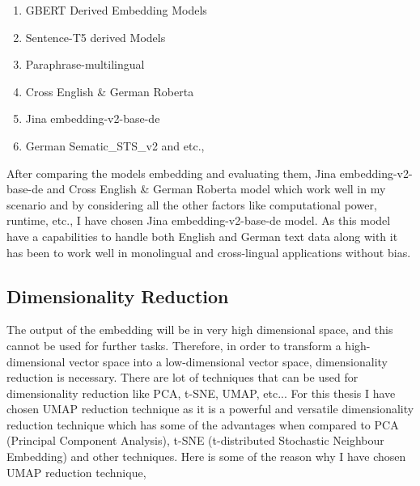  \begin{enumerate}
    \item GBERT Derived Embedding Models
    \item Sentence-T5 derived Models
    \item Paraphrase-multilingual
    \item Cross English \& German Roberta
    \item Jina embedding-v2-base-de
    \item German Sematic\_STS\_v2 and etc.,
\end{enumerate}

After comparing the models embedding and evaluating them, Jina embedding-v2-base-de and Cross English \& German Roberta model 
which work well in my scenario and by considering  all the other factors  like computational power, runtime, etc., 
I have chosen Jina embedding-v2-base-de model. As this model have a capabilities to handle both English and German text data 
along with it has been to work well in monolingual and cross-lingual applications without bias.


\subsection{Dimensionality Reduction}

The output of the embedding will be in very high dimensional space, and this cannot be used for further tasks. 
Therefore, in order to transform a high-dimensional vector space into a low-dimensional vector space, dimensionality
 reduction is necessary. There are lot of techniques that can be used for dimensionality reduction like PCA, t-SNE,
 UMAP, etc... For this thesis I have chosen UMAP reduction technique as it is a powerful and versatile dimensionality 
 reduction technique which has some of the advantages when compared to PCA (Principal Component Analysis), t-SNE 
 (t-distributed Stochastic Neighbour Embedding) and other techniques. Here is some of the reason why I have chosen 
 UMAP reduction technique,

